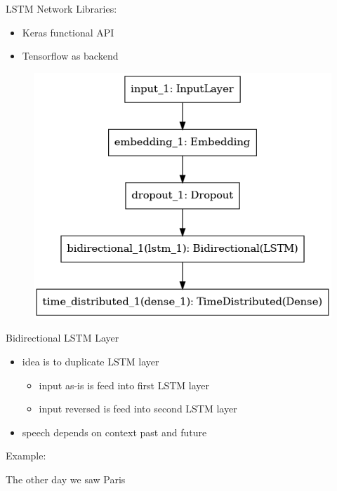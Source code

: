 \documentclass[12pt, tikz]{beamer}
\begin{document}
\begin{frame}[fragile]{LSTM Network}
	Libraries:
	\begin{itemize}
		\item Keras functional API
		\item Tensorflow as backend
	\end{itemize}
	\pause
	\begin{figure}
	\includegraphics[width=0.6\textheight]{img/lstm_model.png}
	\end{figure}
\end{frame}

\begin{frame}[fragile]{Bidirectional LSTM Layer}
	\begin{itemize}
		\item idea is to duplicate LSTM layer
		\begin{itemize}
			\item input as-is is feed into first LSTM layer
			\item input reversed is feed into second LSTM layer
		\end{itemize}
		\item speech depends on context past and future
	\end{itemize}

	\pause

	Example:

	The other day we saw Paris  \uncover<3->{\textcolor{red}{Hilton.}} 
\end{frame}
\end{document}
